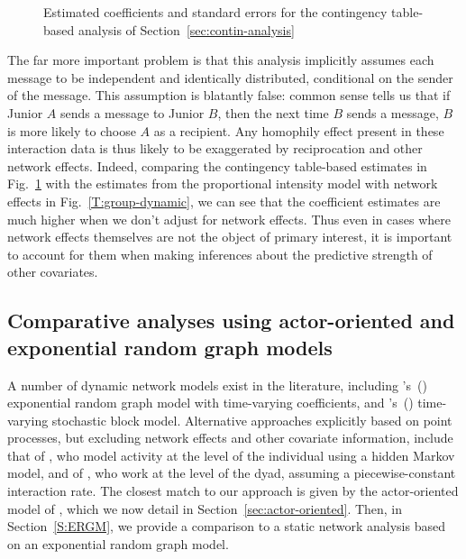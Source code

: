 \documentclass[final]{statsoc}
\begin{document}
\begin{figure}
  \centering
  \makebox[\textwidth]{
    \scriptsize
    
  }
  \caption{
    Estimated coefficients and standard errors for the contingency table-based analysis of Section~\ref{sec:contin-analysis}
  }
  \label{T:group-static}
\end{figure}

The far more important
problem is that this analysis implicitly assumes each message to be
independent and identically distributed, conditional on the sender of
the message.  This assumption is blatantly false: common sense tells us that if Junior $A$ sends a message
to Junior $B$, then the next time $B$ sends a message, $B$ is more likely to
choose $A$ as a recipient.  Any homophily effect present in these interaction
data is thus likely to be exaggerated by reciprocation and other network effects.  Indeed,
comparing the contingency table-based estimates in Fig.~\ref{T:group-static}
with the estimates from the proportional intensity model with network effects
in Fig.~\ref{T:group-dynamic}, we can see that the coefficient estimates are
much higher when we don't adjust for network effects.  Thus even in cases where network effects themselves
are not the object of primary interest, it is important to account for them when
making inferences about the predictive strength of other covariates.


\subsection{Comparative analyses using actor-oriented and exponential random graph models}
\label{S:actor-ergm-comparison}

A number of dynamic network models exist in the literature, including
's~(\citeyear{hanneke2010discrete})
exponential random graph model with time-varying coefficients,  and
's~(\citeyear{kolar2010estimating})
time-varying stochastic block model.  Alternative approaches explicitly based
on point processes, but excluding network effects and other covariate
information, include that of \citet{malmgen2009characterizing}, who model
activity at the level of the individual using a hidden Markov model, and of
\citet{heard2010bayesian}, who work at the level of the dyad, assuming a
piecewise-constant interaction rate.  The closest match to our approach is
given by the actor-oriented model of
\citet{snijders2001statistical,snijders2005models}, which we now detail in
Section~\ref{sec:actor-oriented}.
Then, in Section~\ref{S:ERGM}, we provide a comparison to a static network
analysis based on an exponential random graph model.
\end{document}

